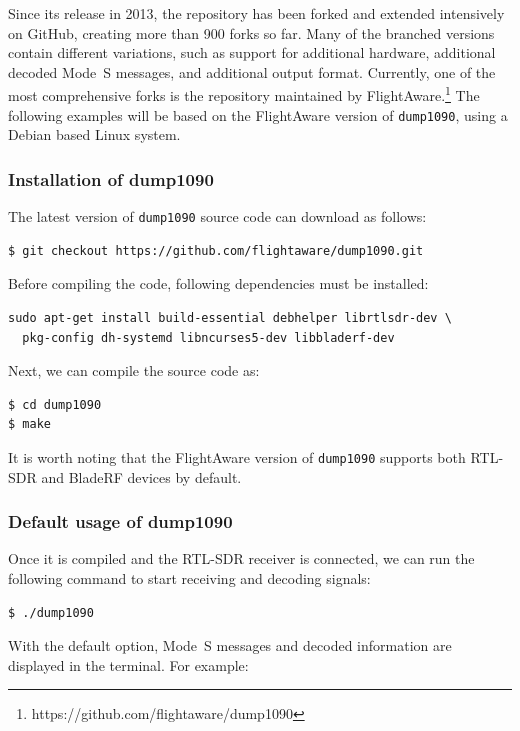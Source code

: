 Since its release in 2013, the repository has been forked and extended intensively on GitHub, creating more than 900 forks so far. Many of the branched versions contain different variations, such as support for additional hardware, additional decoded Mode~S messages, and additional output format. Currently, one of the most comprehensive forks is the repository maintained by FlightAware.\footnote{https://github.com/flightaware/dump1090} The following examples will be based on the FlightAware version of \texttt{dump1090}, using a Debian based Linux system.

\subsubsection{Installation of dump1090}
The latest version of \texttt{dump1090} source code can download as follows:

\begin{verbatim}
$ git checkout https://github.com/flightaware/dump1090.git
\end{verbatim}

Before compiling the code, following dependencies must be installed:

\begin{verbatim}
sudo apt-get install build-essential debhelper librtlsdr-dev \
  pkg-config dh-systemd libncurses5-dev libbladerf-dev
\end{verbatim}

Next, we can compile the source code as:

\begin{verbatim}
$ cd dump1090
$ make
\end{verbatim}

It is worth noting that the FlightAware version of \texttt{dump1090} supports both RTL-SDR and BladeRF devices by default.

\subsubsection{Default usage of dump1090}

Once it is compiled and the RTL-SDR receiver is connected, we can run the following command to start receiving and decoding signals:

\begin{verbatim}
$ ./dump1090
\end{verbatim}

With the default option, Mode~S messages and decoded information are displayed in the terminal. For example:

